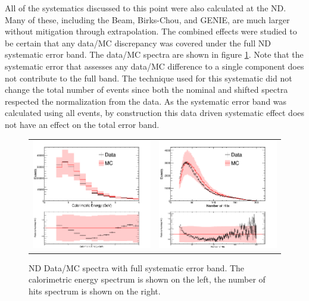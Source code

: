 All of the systematics discussed to this point were also calculated at the ND. Many of these, including the Beam, Birks-Chou, and GENIE, are much larger without mitigation through extrapolation. The combined effects were studied to be certain that any data/MC discrepancy was covered under the full ND systematic error band. The data/MC spectra are shown in figure \ref{fig:NDSystBand}. Note that the systematic error that assesses any data/MC difference to a single component does not contribute to the full band. The technique used for this systematic did not change the total number of events since both the nominal and shifted spectra respected the normalization from the data. As the systematic error band was calculated using all events, by construction this data driven systematic effect does not have an effect on the total error band.
\begin{figure}[htb]
  \centering
  \begin{tabular}{c c}
    \includegraphics[width=.44\textwidth]{figures/Systs/cCalENDAll.png} &
    \includegraphics[width=.44\textwidth]{figures/Systs/cNHitNDAll.png} \\
  \end{tabular}
  \caption[ND Data/MC Spectra with Systematics]{ND Data/MC spectra with full systematic error band. The calorimetric energy spectrum is shown on the left, the number of hits spectrum is shown on the right.}
  \label{fig:NDSystBand}
\end{figure}

